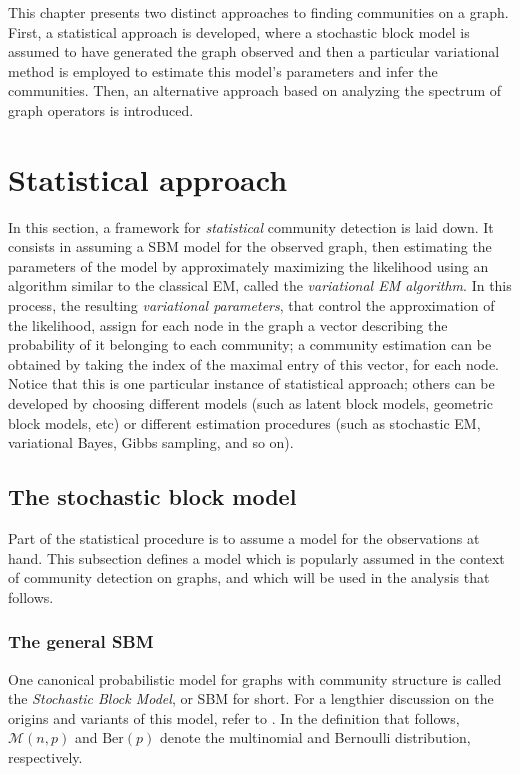\documentclass[../../main.tex]{subfiles} %
\begin{document}
This chapter presents two distinct approaches to finding communities on a 
graph. First, a statistical approach is developed, where a stochastic block model 
is assumed to have generated the graph observed and then a particular 
variational method is employed to estimate this model's parameters and infer 
the communities. Then, an alternative approach based on analyzing the 
spectrum of graph operators is introduced. 

\section{Statistical approach}
In this section, a framework for \textit{statistical} community detection is laid 
down. It consists in assuming a SBM model for the observed graph, then 
estimating the parameters of the model by approximately maximizing the 
likelihood using an algorithm similar to the classical EM, called the 
\textit{variational EM algorithm}. In this process, the resulting 
\textit{variational 
parameters}, that control the approximation of the likelihood, assign 
for each 
node in the graph a vector describing the probability of it belonging 
to each 
community; a community estimation can be obtained by taking the 
index of the 
maximal entry of this vector, for each node. Notice that this is one 
particular 
instance of statistical approach; others can be developed by choosing 
different 
models (such as latent block models, geometric block models, etc) or 
different 
estimation procedures (such as stochastic EM, variational Bayes, 
Gibbs 
sampling, and so on).

\subsection{The stochastic block model}
Part of the statistical procedure is to assume a model for the observations at 
hand. This subsection defines a model which is popularly assumed in the 
context of community detection on graphs, and which will be used in the 
analysis that follows.

\subsubsection{The general SBM}
One canonical probabilistic model for graphs with community structure is 
called 
the \textit{Stochastic Block Model}, or SBM for short. For a lengthier 
discussion 
on the origins and variants of this model, refer to 
\cite{abbe_community_2017}. In the definition that follows, \(\mathcal M(n, p)\) 
and \(\text{Ber}(p)\) denote the multinomial and Bernoulli distribution, 
respectively.
\end{document}
